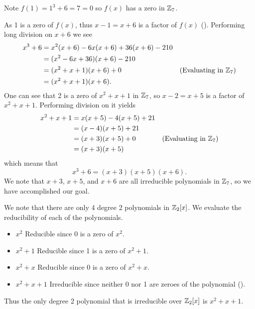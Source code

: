 \begin{questions}
    \item \begin{partquestions}{\roman*}
        \item Note $f(1) = 1^3 + 6 = 7 = 0$ so $f(x)$ has a zero in $\mathbb{Z}_7$.

        \item As 1 is a zero of $f(x)$, thus $x-1 = x+6$ is a factor of $f(x)$ (). Performing long division on $x+6$ we see
        \begin{align*}
            x^3 + 6 &= x^2(x+6) - 6x(x+6) + 36(x+6) - 210\\
            &= (x^2-6x+36)(x+6) - 210\\
            &= (x^2+x+1)(x+6) + 0 & (\text{Evaluating in }\mathbb{Z}_7)\\
            &= (x^2+x+1)(x+6).
        \end{align*}
        One can see that 2 is a zero of $x^2 + x + 1$ in $\mathbb{Z}_7$, so $x - 2 = x+5$ is a factor of $x^2 + x + 1$. Performing division on it yields
        \begin{align*}
            x^2 + x + 1 &= x(x+5) - 4(x+5) + 21\\
            &= (x-4)(x+5) + 21\\
            &= (x+3)(x+5) + 0 & (\text{Evaluating in }\mathbb{Z}_7)\\
            &= (x+3)(x+5)
        \end{align*}
        which means that
        \[
            x^3 + 6 = (x+3)(x+5)(x+6).
        \]
        We note that $x+3$, $x+5$, and $x+6$ are all irreducible polynomials in $\mathbb{Z}_7$, so we have accomplished our goal.
    \end{partquestions}

    \item \begin{partquestions}{\alph*}
        \item We note that there are only 4 degree 2 polynomials in $\mathbb{Z}_2[x]$. We evaluate the reducibility of each of the polynomials.
        \begin{itemize}
            \item $\boxed{x^2}$ Reducible since 0 is a zero of $x^2$.
            \item $\boxed{x^2 + 1}$ Reducible since 1 is a zero of $x^2 + 1$.
            \item $\boxed{x^2+x}$ Reducible since 0 is a zero of $x^2 + x$.
            \item $\boxed{x^2+x+1}$ Irreducible since neither 0 nor 1 are zeroes of the polynomial ().
        \end{itemize}
        Thus the only degree 2 polynomial that is irreducible over $\mathbb{Z}_2[x]$ is $x^2+x+1$.


\end{partquestions}
\end{questions}
